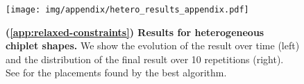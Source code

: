 \begin{figure}[h]
\centering
\captionsetup{justification=centering}
\vspace{-1.0em}
\texttt{[image: img/appendix/hetero\_results\_appendix.pdf]}
%
\caption{\textbf{(\textsection \ref{app:relaxed-constraints}) Results for heterogeneous chiplet shapes.}
We show the evolution of the result over time (left) and the distribution of the final result over 10 repetitions (right).
See  for the placements found by the best algorithm.}
\label{fig:app-hetero-results}
\vspace{-1.75em}
\end{figure}
